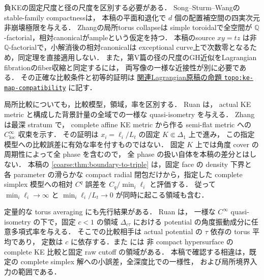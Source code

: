 \documentclass[a4paper,11pt]{ltjsarticle}
\numberwithin{equation}{section}
\theoremstyle{plain}
\theoremstyle{definition}
\theoremstyle{remark}
\begin{document}
負KEの固定尺度と径の尺度を区別する必要がある．
Song--Sturm--Wang\cite[Theorem~6.1]{SongSturmWang}のstable-family compactnessは，
本稿の平面和退化で $d$ 個の配置補空間の四実次元非崩壊極限を与える．
Zhang\cite[Theorem~2.4]{ZhangNegativeKE}の局所torus collapseは
simple toroidalで全空間が $\mathbb Q$-factorial，相対canonicalがampleという仮定を持つ．
本稿のsource $xy=tz$ は非 $\mathbb Q$-factorialで，小解消後の相対canonicalは
exceptional curve上で次数零となるため，同定理を直接適用しない．
また，第V篇の径の尺度のGH近似をLagrangian fibrationのfiber収縮と同定するには，
両写像の一様な近接性が別に必要である．
その正確な比較条件と初等的証明は
\href{https://github.com/uedakazushi/surface-lagrangian-torus-fibration/blob/32c67aefe6beb47c2955923e2b6eb2471d48af31/papers/sections/paper/base_topology.tex}
{関連Lagrangian原稿の命題 \texttt{topo:ke-map-compatibility}} に記す．

局所比較についても，比較模型，領域，率を区別する．
Ruan\cite[Theorem~4.2]{RuanI}\cite[Theorem~5.2]{RuanII} は，
actual KE metric と構成した背景計量の全域での一様な quasi-isometry を与える．
Zhang\cite[Theorem~2.4(ii), Lemmas~3.2--3.3 and~3.5, Proposition~3.4]{ZhangNegativeKE} は最深 stratum で，
complete affine KE metric から作る semi-flat metric への $C^\infty_{\mathrm{loc}}$ 収束を示す．
その証明は $x_i=\ell_i/L_t$ の固定 $K\Subset\Delta_1$ 上で進み，
この指定模型への比較誤差に有効な率を付すものではない．
固定 $K$ 上では角度 cover の周期性によって全 phase を含むので，
全 phase の扱い自体を本稿の差分とはしない．
本稿の \cref{coarse:thm:boundary-to-triple} は，固定 face の density 下界と
各 parameter の滑らかな compact radial 閉包だけから，指定した complete simplex
模型への相対 $C^q$ 誤差を $C_q/\min_i\ell_i$ と評価する．
従って $\min_i\ell_i\to\infty$ と $\min_i\ell_i/L_t\to0$ が同時に起こる領域も含む．

定量的な torus averaging にも先行結果がある．
Ruan\cite[Proposition~3.1, Corollary~3.1]{RuanHMinimal} は，
一様な $C^\infty$ quasi-isometry の下で，固定 $c<1$ の領域 $\Delta_{c\tau}$ における
potential の角度振動成分に任意多項式率を与える．
そこでの比較相手は actual potential の $\tau$ 依存の torus 平均であり，
定数は $c$ に依存する．また\cite[Theorems~6.2--6.3, Lemma~8.1]{RuanPantsKE} には
非 compact hypersurface の complete KE 比較と固定 raw cutoff の領域がある．
本稿で確認する相違は，既定の complete simplex 解への小誤差，全深度比での一様性，
および局所境界入力の範囲である．
\end{document}
